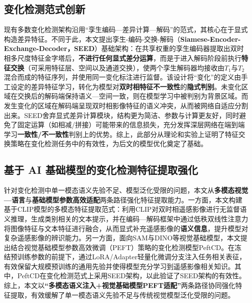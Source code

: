 \subsection{变化检测范式创新}
现有多数变化检测架构沿用“孪生编码—差异计算—解码”的范式，其核心在于显式构造差异特征。不同于此，本文提出孪生-编码-交换-解码（\textbf{Siamese-Encoder-Exchange-Decoder，SEED}）基础架构：在共享权重的孪生编码器提取出双时相多尺度特征金字塔后，\textbf{不进行任何显式差分运算}，而是于进入解码阶段前执行\textbf{特征交换}（可采用特征层、空间以及通道交换），使两个孪生解码器均接收由\(T_1\)与\(T_2\)混合而成的特征序列，并使用同一变化标注进行监督。该设计将“变化”的定义由手工设定的差异特征学习，转化为模型对\textbf{双时相特征不一致性}的\textbf{隐式判别}。未变化区域在交换后的解码端保持语义—空间一致，则在模型学习中被判别为背景区域。而发生变化的区域在解码端呈现双时相影像特征的语义冲突，从而被网络自适应分割出来。SEED舍弃显式差异计算模块，结构更为简洁、参数与计算更友好，同时避免了固定运算（如相减/拼接）可能带来的信息损失，充分发挥深层网络在端到端学习\textbf{一致性/不一致性}判别上的优势。综上，此部分从理论和实验上证明了特征交换策略在变化检测任务中的有效性，为后文的模型优化奠定了基础。

\subsection{基于 AI 基础模型的变化检测特征提取强化}
针对变化检测中单一模态语义先验不足、模型泛化受限的问题，本文从\textbf{多模态视觉—语言}与\textbf{基础模型参数高效适配}两条路径强化特征提取能力。一方面，本文构建基于CLIP模型的多模态特征提取范式：利用CLIP对双时相遥感影像进行无监督语义推理，生成类别相关的文本提示，并在编码—解码框架中通过低秩双线性注意力将图像特征与文本特征进行融合，从而显式补充遥感影像的\textbf{语义信息}，提升模型对复杂遥感影像的辨识能力。另一方面，面向SAM与DINO等视觉基础模型，本文提出结合视觉基础模型参数高效微调（PEFT）策略的变化检测模型PeftCD。在冻结预训练参数的前提下，通过LoRA/Adapter轻量化微调分支注入任务相关表征，有效保留大规模预训练的通用先验并使得模型充分学习到遥感影像相关知识。其中，PeftCD在变化检测范式上采用SEED架构，以此验证了SEED架构的有效性。综上，本文以\textbf{“多模态语义注入+视觉基础模型PEFT适配”}两条路径协同强化特征提取，有效缓解了单一模态语义先验不足与传统视觉模型泛化受限的问题。

